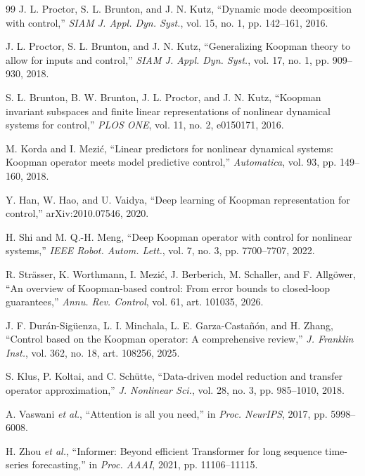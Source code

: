 \documentclass[journal]{IEEEtran}
\begin{document}
\begin{thebibliography}{99}
J. L. Proctor, S. L. Brunton, and J. N. Kutz, ``Dynamic mode decomposition with control,'' \emph{SIAM J. Appl. Dyn. Syst.}, vol. 15, no. 1, pp. 142--161, 2016.

J. L. Proctor, S. L. Brunton, and J. N. Kutz, ``Generalizing Koopman theory to allow for inputs and control,'' \emph{SIAM J. Appl. Dyn. Syst.}, vol. 17, no. 1, pp. 909--930, 2018.

S. L. Brunton, B. W. Brunton, J. L. Proctor, and J. N. Kutz, ``Koopman invariant subspaces and finite linear representations of nonlinear dynamical systems for control,'' \emph{PLOS ONE}, vol. 11, no. 2, e0150171, 2016.

M. Korda and I. Mezi\'c, ``Linear predictors for nonlinear dynamical systems: Koopman operator meets model predictive control,'' \emph{Automatica}, vol. 93, pp. 149--160, 2018.

Y. Han, W. Hao, and U. Vaidya, ``Deep learning of Koopman representation for control,'' arXiv:2010.07546, 2020.

H. Shi and M. Q.-H. Meng, ``Deep Koopman operator with control for nonlinear systems,'' \emph{IEEE Robot. Autom. Lett.}, vol. 7, no. 3, pp. 7700--7707, 2022.

R. Str\"asser, K. Worthmann, I. Mezi\'c, J. Berberich, M. Schaller, and F. Allg\"ower, ``An overview of Koopman-based control: From error bounds to closed-loop guarantees,'' \emph{Annu. Rev. Control}, vol. 61, art. 101035, 2026.

J. F. Dur\'an-Sig\"uenza, L. I. Minchala, L. E. Garza-Casta\~n\'on, and H. Zhang, ``Control based on the Koopman operator: A comprehensive review,'' \emph{J. Franklin Inst.}, vol. 362, no. 18, art. 108256, 2025.

S. Klus, P. Koltai, and C. Sch\"utte, ``Data-driven model reduction and transfer operator approximation,'' \emph{J. Nonlinear Sci.}, vol. 28, no. 3, pp. 985--1010, 2018.

A. Vaswani \emph{et al.}, ``Attention is all you need,'' in \emph{Proc. NeurIPS}, 2017, pp. 5998--6008.

H. Zhou \emph{et al.}, ``Informer: Beyond efficient Transformer for long sequence time-series forecasting,'' in \emph{Proc. AAAI}, 2021, pp. 11106--11115.


\end{thebibliography}
\end{document}
